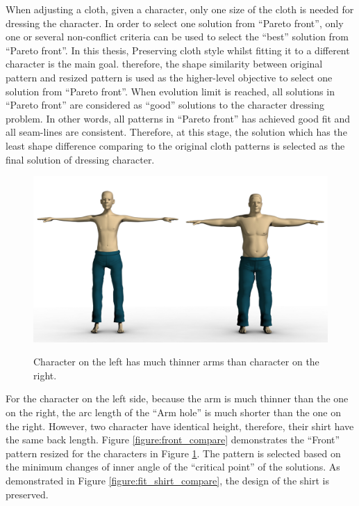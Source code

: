 When adjusting a cloth, given a character, only one size of the cloth is needed for dressing the character. In order to select one solution from ``Pareto front'', only one or several non-conflict criteria can be used to select the ``best'' solution from ``Pareto front''. In this thesis, Preserving cloth style whilst fitting it to a different character is the main goal. therefore, the shape similarity between original pattern and resized pattern is used as the higher-level objective to select one solution from ``Pareto front''. When evolution limit is reached, all solutions in ``Pareto front'' are considered as ``good'' solutions to the character dressing problem. In other words, all patterns in ``Pareto front'' has achieved good fit and all seam-lines are consistent. Therefore, at this stage, the solution which has the least shape difference comparing to the original cloth patterns is selected as the final solution of dressing character. 

\begin{figure}[H]
	\centering
	\includegraphics[width=1\columnwidth]{../images/sknny_fatty_fit_body}\\[0.1cm]
    \caption[Dressing two characters]{Character on the left has much thinner arms than character on the right.}
    \label{figure:character_compare}
\end{figure}

For the character on the left side, because the arm is much thinner than the one on the right, the arc length of the ``Arm hole'' is much shorter than the one on the right. However, two character have identical height, therefore, their shirt have the same back length. Figure \ref{figure:front_compare} demonstrates the ``Front'' pattern resized for the characters in Figure \ref{figure:character_compare}. The pattern is selected based on the minimum changes of inner angle of the ``critical point'' of the solutions. As demonstrated in Figure \ref{figure:fit_shirt_compare}, the design of the shirt is preserved. 

